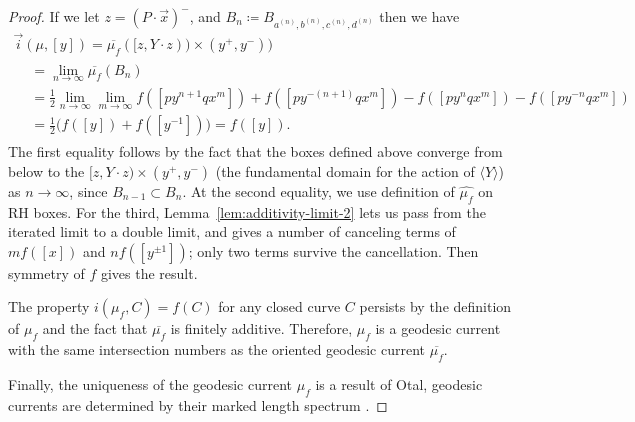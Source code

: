 \documentclass[11pt]{amsart}
\newcommand{\ora}[1]{\overrightarrow{#1}}
\numberwithin{equation}{section}
\numberwithin{figure}{section}
\theoremstyle{definition}
\theoremstyle{plain}
\newcommand*{\wh}[1]{\widehat{#1}}
\begin{document}
\begin{proof}
If we let $z=(P \cdot \ora{x})^-$, and $B_n \coloneqq B_{a^{(n)}, b^{(n)}, c^{(n)}, d^{(n)}}$ then we have
    \begin{multline*}
      \vec{i}(\mu, [y])=\overline{\mu_f}([z,Y \cdot z))\times (y^+,y^-)) \\
      \begin{aligned}
    &= \lim_{n\to\infty} \overline{\mu_f}(B_n)  \\
    &= \frac{1}{2}\lim_{n\to\infty}\lim_{m\to\infty}f([py^{n+1}qx^{m}]) + f([py^{-(n+1)}qx^{m}])-f([py^{n}qx^{m}]) - f([py^{-n}qx^{m}]) \\
    &= \frac{1}{2}\bigl(f([y]) + f([y^{-1}])\bigr) =f([y]).
      \end{aligned}
    \end{multline*}
    The first equality follows by the fact that the boxes defined
    above converge from below to the  $[z,Y
      \cdot z) \times (y^+,y^-)$ (the fundamental domain for the
  action of $\langle Y \rangle$) as $n \to \infty$, since $B_{n-1} \subset B_n$.
    At the second equality, we use definition of $\wh{\mu_f}$ on RH boxes.
    For the third, Lemma~\ref{lem:additivity-limit-2} lets us pass
    from the iterated limit to a double limit, and gives a
    number of canceling terms of $mf([x])$ and $nf([y^{\pm 1}])$; only
    two terms survive the cancellation. Then symmetry of $f$ gives the result.

      The property $i(\mu_f, C)=f(C)$ for any closed curve $C$ persists by the definition of $\mu_f$ and the fact that $\overline{\mu_f}$ is finitely additive. Therefore, $\mu_f$ is a geodesic current with the same intersection numbers as the oriented geodesic current $\overline{\mu_f}$.

 Finally, the uniqueness of the geodesic current $\mu_f$ is
 a result of Otal, geodesic currents are determined by their marked
 length spectrum \cite[Th\'eor\`eme~2]{Otal90:SpectreMarqueNegative}.
\end{proof}
\end{document}

